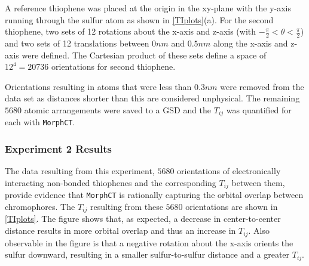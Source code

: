 A reference thiophene was placed at the origin in the xy-plane
with the y-axis running through the sulfur atom as shown in \autoref{TIplots}(a). For the second thiophene,
two sets of 12 rotations about the x-axis and z-axis (with $- \frac{\pi}{2} < \theta< \frac{\pi}{2}$)
and two sets of 12 translations between $0nm$ and $0.5nm$ along the x-axis and z-axis were defined.
The Cartesian product of these sets define a space of $12^{4}= 20736$ orientations for second thiophene. 

Orientations resulting in atoms that were less
than $0.3nm$ were removed from the data set as distances shorter than this are considered
unphysical. The remaining $5680$ atomic arrangements were saved to a GSD and the $T_{ij}$ was quantified for
each with \texttt{MorphCT}. 

\subsubsection{Experiment 2 Results}

The data resulting from this experiment, $5680$ orientations of electronically 
interacting non-bonded thiophenes and the
corresponding $T_{ij}$ between them, provide evidence that \texttt{MorphCT} is rationally capturing the orbital
overlap between chromophores. 
The $T_{ij}$ resulting from these $5680$ orientations are shown in \autoref{TIplots}. 
The figure shows that, as expected, a decrease in 
center-to-center distance results in more orbital overlap and thus an increase in $T_{ij}$. 
Also observable in the figure is that
a negative rotation about the x-axis orients the sulfur downward, resulting in a smaller sulfur-to-sulfur distance 
and a greater $T_{ij}$. 

